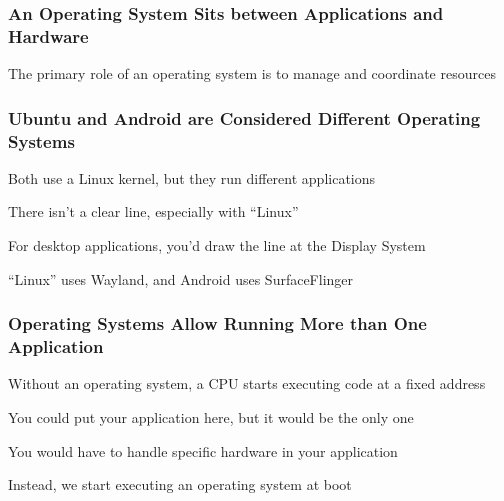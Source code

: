   \begin{frame}
    \frametitle{An Operating System Sits between Applications and Hardware}

    \centering

    \begin{flushright}
      The primary role of an operating system is to manage and coordinate resources
    \end{flushright}
  \end{frame}

  \begin{frame}
    \frametitle{Ubuntu and Android are Considered Different Operating Systems}

    Both use a Linux kernel, but they run different applications

    \vspace{2em}

    There isn't a clear line, especially with ``Linux''

    \vspace{4em}

    For desktop applications, you'd draw the line at the Display System

    \vspace{2em}

    ``Linux'' uses Wayland, and Android uses SurfaceFlinger
  \end{frame}

  \begin{frame}
    \frametitle{Operating Systems Allow Running More than One Application}

    Without an operating system, a CPU starts executing code at a fixed address

    \vspace{4em}

    You could put your application here, but it would be the only one

    \vspace{2em}

    You would have to handle specific hardware in your application

    \vspace{4em}

    Instead, we start executing an operating system at boot
  \end{frame}

